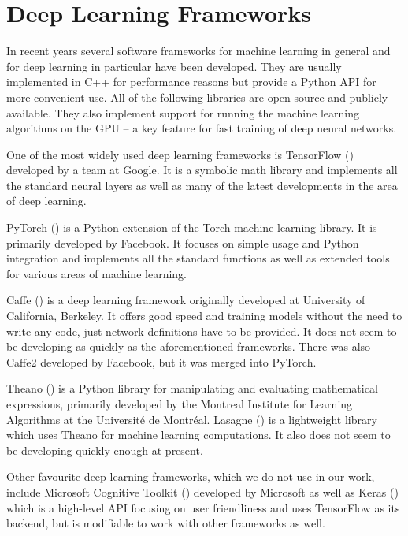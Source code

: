 \section{Deep Learning Frameworks}
In recent years several software frameworks for machine learning in general and for deep learning in particular have been developed. They are usually implemented in C++ for performance reasons but provide a Python API for more convenient use. All of the following libraries are open-source and publicly available. They also implement support for running the machine learning algorithms on the GPU -- a key feature for fast training of deep neural networks. \par
One of the most widely used deep learning frameworks is TensorFlow (\cite{martin_abadi_tensorflow:_2015}) developed by a team at Google. It is a symbolic math library and implements all the standard neural layers as well as many of the latest developments in the area of deep learning.  \par
PyTorch (\cite{paszke_automatic_2017}) is a Python extension of the Torch machine learning library. It is primarily developed by Facebook. It focuses on simple usage and Python integration and implements all the standard functions as well as extended tools for various areas of machine learning. \par
Caffe (\cite{jia_caffe:_2014}) is a deep learning framework originally developed at University of California, Berkeley. It offers good speed and training models without the need to write any code, just network definitions have to be provided. It does not seem to be developing as quickly as the aforementioned frameworks. There was also Caffe2 developed by Facebook, but it was merged into PyTorch. \par
Theano (\cite{theano_development_team_theano:_2016}) is a Python library for manipulating and evaluating mathematical expressions, primarily developed by the Montreal Institute for Learning Algorithms at the Université de Montréal. Lasagne (\cite{dieleman_lasagne:_2015}) is a lightweight library which uses Theano for machine learning computations. It also does not seem to be developing quickly enough at present. \par
Other favourite deep learning frameworks, which we do not use in our work, include Microsoft Cognitive Toolkit (\cite{seide_cntk:_2016}) developed by Microsoft as well as Keras (\cite{chollet_keras_2015}) which is a high-level API focusing on user friendliness and uses TensorFlow as its backend, but is modifiable to work with other frameworks as well.

